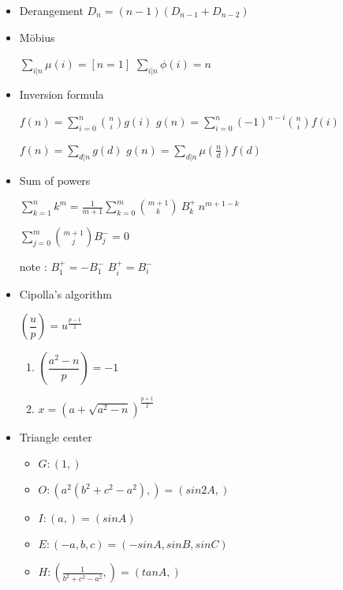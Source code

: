 \begin{itemize}

    \item Derangement
    $D_n=(n-1)(D_{n-1}+D_{n-2})$

    \item Möbius

    $\sum\limits_{i|n} \mu(i)=[n=1]$
    $\sum\limits_{i|n} \phi(i)=n$

    \item Inversion formula

    $f(n)=\sum\limits_{i=0}^n{n \choose i}g(i)$
    $g(n)=\sum\limits_{i=0}^n(-1)^{n-i}{n \choose i}f(i)$

    $f(n)=\sum\limits_{d|n}g(d)$
    $g(n)=\sum\limits_{d|n}\mu(\frac{n}{d})f(d)$

    \item Sum of powers

    $\sum_{k=1}^{n} k^m=\frac{1}{m+1}\sum_{k=0}^{m}{{m+1}\choose{k}}~B^+_k~n^{m+1-k}$

    $\sum_{j=0}^{m}{m+1\choose j}B^-_j=0$

    note :
    $B^+_1=-B^-_1$
    $B^+_i=B^-_i$

    \item Cipolla's algorithm

    $\left(\dfrac{u}{p}\right)=u^{\frac{p-1}{2}}$

    \begin{enumerate}
        \item $\left(\dfrac{a^2-n}{p}\right)=-1$
        \item $x=(a+\sqrt{a^2-n})^{\frac{p+1}{2}}$
    \end{enumerate}

    \item Triangle center
    
    \begin{itemize}
    \item $G : (1,)$
    \item $O : (a^2(b^2+c^2-a^2),)=(sin2A,)$
    \item $I : (a,)=(sinA)$
    \item $E : (-a, b, c)=(-sinA, sinB, sinC)$
    \item $H : (\frac{1}{b^2+c^2-a^2},)=(tanA,)$
    \end{itemize}

    

\end{itemize}
